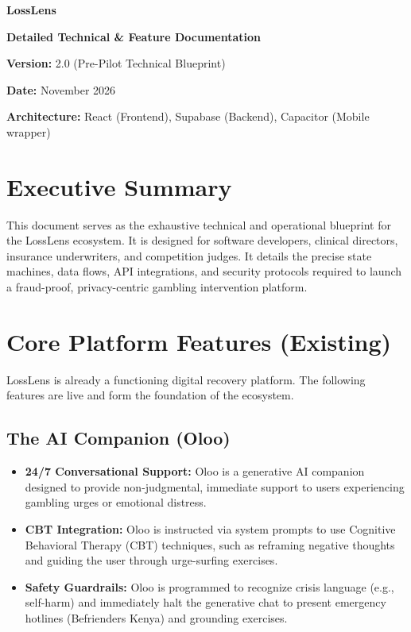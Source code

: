 \documentclass[11pt,a4paper]{article}
\begin{document}
\begin{titlepage}
    \centering
    \vspace*{2cm}
    {\Huge \textbf{\textcolor{primary}{LossLens}} \par}
    \vspace{0.5cm}
    {\Large \textbf{Detailed Technical \& Feature Documentation} \par}
    \vspace{1.5cm}
    {\large \textbf{Version:} 2.0 (Pre-Pilot Technical Blueprint) \par}
    {\large \textbf{Date:} November 2026 \par}
    {\large \textbf{Architecture:} React (Frontend), Supabase (Backend), Capacitor (Mobile wrapper) \par}
    \vfill
\end{titlepage}

\newpage
\tableofcontents
\newpage

\section{Executive Summary}
This document serves as the exhaustive technical and operational blueprint for the LossLens ecosystem. It is designed for software developers, clinical directors, insurance underwriters, and competition judges. It details the precise state machines, data flows, API integrations, and security protocols required to launch a fraud-proof, privacy-centric gambling intervention platform.

\section{Core Platform Features (Existing)}
LossLens is already a functioning digital recovery platform. The following features are live and form the foundation of the ecosystem.

\subsection{The AI Companion (Oloo)}
\begin{itemize}
    \item \textbf{24/7 Conversational Support:} Oloo is a generative AI companion designed to provide non-judgmental, immediate support to users experiencing gambling urges or emotional distress.
    \item \textbf{CBT Integration:} Oloo is instructed via system prompts to use Cognitive Behavioral Therapy (CBT) techniques, such as reframing negative thoughts and guiding the user through urge-surfing exercises.
    \item \textbf{Safety Guardrails:} Oloo is programmed to recognize crisis language (e.g., self-harm) and immediately halt the generative chat to present emergency hotlines (Befrienders Kenya) and grounding exercises.
\end{itemize}
\end{document}
